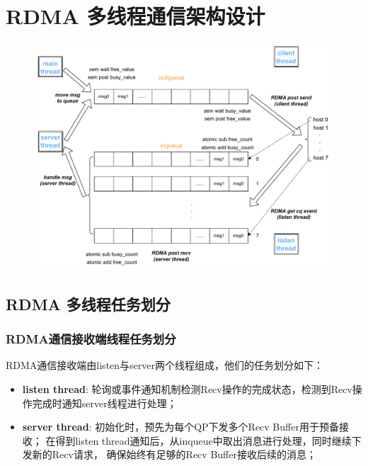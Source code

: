 {    \section{RDMA 多线程通信架构设计}

    \begin{figure}[H]
        \centering
        \includegraphics[width=1.1\textwidth]{Img/RDMA_design.drawio.pdf}
    \end{figure}


    \subsection{RDMA 多线程任务划分}

    \subsubsection{RDMA通信接收端线程任务划分}
    RDMA通信接收端由listen与server两个线程组成，他们的任务划分如下：

    \begin{itemize}[leftmargin=*, nosep]
        \item \textbf{listen thread}:
              轮询或事件通知机制检测Recv操作的完成状态，检测到Recv操作完成时通知server线程进行处理；
        \item \textbf{server thread}:
              初始化时，预先为每个QP下发多个Recv Buffer用于预备接收；
              在得到listen thread通知后，从inqueue中取出消息进行处理，同时继续下发新的Recv请求，
              确保始终有足够的Recv Buffer接收后续的消息；
    \end{itemize}

}
